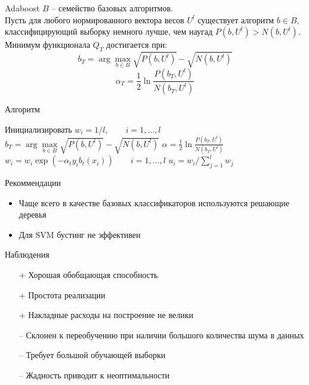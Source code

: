 \documentclass[10pt]{beamer}
\begin{document}
\begin{frame}{Adaboost}
  $B$ -- семейство базовых алгоритмов.\\
  \bigbreak
  Пусть для любого нормированного вектора весов $U^l$ существует алгоритм $b \in B$, классифицирующий выборку немного лучше, чем наугад $P(b, U^l) > N (b, U^l)$. \\
  Минимум функционала $Q_T$ достигается при:\\
  $$b_T = \arg\max\limits_{b \in B} \sqrt{P(b, U^l)} - \sqrt{N(b, U^l)}$$
  $$\alpha_T = \frac{1}{2} \ln \frac{P(b_T, U^l)}{N(b_T, U^l)}$$
\end{frame}

\begin{frame}{Алгоритм}
  \begin{algorithmic}[1]
      \State Инициализировать $w_i = 1 / l, \qquad i=1, \dots, l$
        \State $b_T = \arg\max\limits_{b \in B} \sqrt{P(b, U^l)} - \sqrt{N(b, U^l)}$
        \State $\alpha = \frac{1}{2} \ln \frac{P(b_T, U^l)}{N(b_T, U^l)}$
        \State $w_i = w_i \exp (- \alpha_t y_i b_t(x_i)) \qquad i=1, \dots, l$
        \State $u_i = w_i / \sum\limits_{j=1}^l w_j$
      \EndFor
    \EndFunction
  \end{algorithmic}
\end{frame}

\begin{frame}{Рекоммендации}
  \begin{itemize}
    \item Чаще всего в качестве базовых классификаторов используются решающие деревья
    \item Для SVM бустинг не эффективен     
  \end{itemize}
\end{frame}

\begin{frame}{Наблюдения}
  \begin{itemize}[<+->]
    \item[+] Хорошая обобщающая способность
    \item[+] Простота реализации
    \item[+] Накладные расходы на построение не велики
    \bigbreak
    \item[--] Склонен к переобучению при наличии большого количества шума в данных
    \item[--] Требует большой обучающей выборки
    \item[--] Жадность приводит к неоптимальности
  \end{itemize}
\end{frame}
\end{document}
